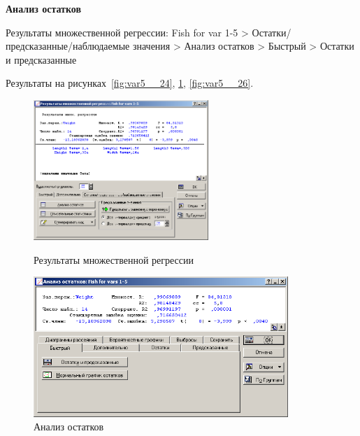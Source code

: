 \newpage

\begin{center}
  \textbf{Анализ остатков}
\end{center}

Результаты множественной регрессии: Fish for var 1-5 > Остатки/предсказанные/наблюдаемые значения > Анализ остатков > Быстрый > Остатки и предсказанные

Результаты на рисунках~\ref{fig:var5__24}, \ref{fig:var5__25}, \ref{fig:var5__26}.

\begin{figure}[!h]
  \centering
  \begin{minipage}{0.29\textwidth}
    \centering

    \includegraphics[height=5.3cm]
    {inc/var5__24.PNG}

    \caption{Результаты множественной регрессии}
    \label{fig:var5__24}
  \end{minipage}
  \begin{minipage}{0.69\textwidth}
    \centering

    \includegraphics[height=5.3cm]
    {inc/var5__25.PNG}

    \caption{Анализ остатков}
    \label{fig:var5__25}
  \end{minipage}
\end{figure}

